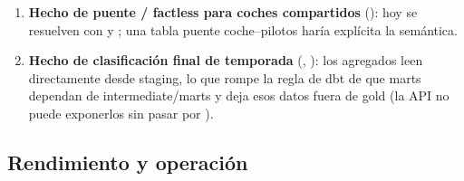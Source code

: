 \begin{enumerate}
\item \textbf{Hecho de puente / factless para coches compartidos} (): hoy se resuelven con  y ; una tabla puente coche–pilotos haría explícita la semántica.
\item \textbf{Hecho de clasificación final de temporada} (, ): los agregados leen  directamente desde staging, lo que rompe la regla de dbt de que marts dependan de intermediate/marts y deja esos datos fuera de gold (la API no puede exponerlos sin pasar por ).
\end{enumerate}

\subsection{Rendimiento y operación}

